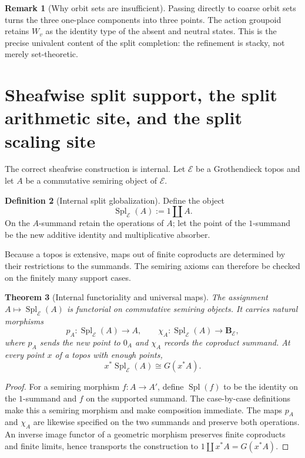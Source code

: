 \documentclass[11pt]{amsart}
\numberwithin{equation}{section}
\newtheorem{theorem}{Theorem}[section]
\theoremstyle{definition}
\newtheorem{definition}[theorem]{Definition}
\newtheorem{remark}[theorem]{Remark}
\newcommand{\B}{\mathbf B}
\newcommand{\Spl}{\operatorname{Spl}}
\begin{document}
\begin{remark}[Why orbit sets are insufficient]
Passing directly to coarse orbit sets turns the three one-place components
into three points.  The action groupoid retains $W_v$ as the identity type
of the absent and neutral states.  This is the precise univalent content of
the split completion: the refinement is stacky, not merely set-theoretic.
\end{remark}

\section{Sheafwise split support, the split arithmetic site, and the split scaling site}
\label{sec:split-scaling-site}

The correct sheafwise construction is internal.  Let $\mathscr E$ be a
Grothendieck topos and let $A$ be a commutative semiring object of
$\mathscr E$.

\begin{definition}[Internal split globalization]
\label{def:internal-split}
Define the object
\[
\Spl_{\mathscr E}(A):=1\amalg A.
\]
On the $A$-summand retain the operations of $A$; let the point of the
$1$-summand be the new additive identity and multiplicative absorber.
\end{definition}

Because a topos is extensive, maps out of finite coproducts are determined
by their restrictions to the summands.  The semiring axioms can therefore
be checked on the finitely many support cases.

\begin{theorem}[Internal functoriality and universal maps]
\label{thm:internal-split-functor}
The assignment $A\mapsto\Spl_{\mathscr E}(A)$ is functorial on commutative
semiring objects.  It carries natural morphisms
\[
p_A:\Spl_{\mathscr E}(A)\to A,
\qquad
\chi_A:\Spl_{\mathscr E}(A)\to\B_{\mathscr E},
\]
where $p_A$ sends the new point to $0_A$ and $\chi_A$ records the coproduct
summand.  At every point $x$ of a topos with enough points,
\[
x^*\Spl_{\mathscr E}(A)\cong G(x^*A).
\]
\end{theorem}

\begin{proof}
For a semiring morphism $f:A\to A'$, define
$\Spl(f)$ to be the identity on the $1$-summand and $f$ on the supported
summand.  The case-by-case definitions make this a semiring morphism and
make composition immediate.  The maps $p_A$ and $\chi_A$ are likewise
specified on the two summands and preserve both operations.  An inverse
image functor of a geometric morphism preserves finite coproducts and
finite limits, hence transports the construction to
$1\amalg x^*A=G(x^*A)$.
\end{proof}
\end{document}
